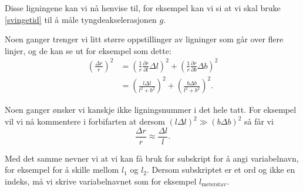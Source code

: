 \documentclass[5p]{elsarticle}	            	%
\begin{document}
Disse ligningene kan vi nå henvise til, for eksempel kan vi si at vi skal bruke 
\eqref{svingetid} til å måle tyngdeakselerasjonen $g$.


Noen ganger trenger vi litt større oppstillinger av ligninger som går over flere linjer, og de kan se ut for eksempel som dette:
\begin{align}
	\left( \frac{\Delta r}{r} \right)^2 &= \left( \frac{1}{r} \frac{\partial r}{\partial l} \Delta l \right)^2 + \left( \frac{1}{r} \frac{\partial r}{\partial b} \Delta b \right)^2 \nonumber \\
		&=  \left( \frac{l \Delta l}{l^2 + b^2} \right)^2 + \left(\frac{b \Delta b}{l^2 + b^2} \right)^2.
\end{align}



Noen ganger ønsker vi kanskje ikke ligningsnummer i det hele tatt. 
For eksempel vil vi nå kommentere i forbifarten at dersom $(l \Delta l)^2 \gg (b \Delta b)^2$ så får vi
\begin{equation*}
	\frac{\Delta r}{r} \approx \frac{\Delta l}{l}.
\end{equation*}

Med det samme nevner vi at vi kan få bruk for subskript for å angi variabelnavn, for eksempel for å skille mellom $l_1$ og $l_2$. Dersom subskriptet er et ord og ikke en indeks, må vi skrive variabelnavnet som for eksempel $l_\text{meterstav}$.

\end{document}
